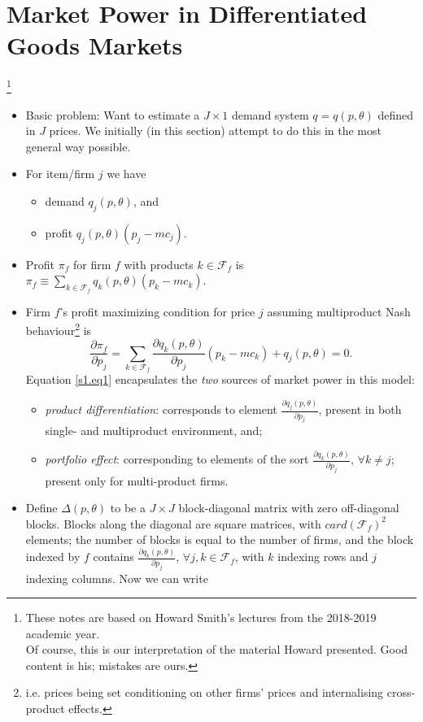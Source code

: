 \documentclass[11pt]{article}
\numberwithin{equation}{section}
\newcommand\blfootnote[1]{%
	\begingroup
	\renewcommand\thefootnote{}\footnote{#1}%
	\addtocounter{footnote}{-1}%
	\endgroup
}
\begin{document}
\section{Market Power in Differentiated Goods Markets}\label{s1}
\blfootnote{These notes are based on Howard Smith's lectures from the 2018-2019 academic year.\\
Of course, this is our interpretation of the material Howard presented. Good content is his; mistakes are ours.}

\vspace{-1cm}
\begin{itemize}
	\item Basic problem: Want to estimate a $J\times 1$ demand system $q=q(p,\theta)$ defined in $J$ prices. We initially (in this section) attempt to do this in the most general way possible.
	\item For item/firm $j$ we have
	\begin{itemize}
		\item demand $q_j(p,\theta)$, and
		\item profit $q_j(p,\theta)(p_j - mc_j)$.
	\end{itemize}
	\item Profit $\pi_f$ for firm $f$ with products $k\in \mathscr{F}_f$ is $\pi_f \equiv \sum_{k\in \mathscr{F}_f}q_k(p,\theta)(p_k - mc_k)$.
	\item Firm $f$'s profit maximizing condition for price $j$ assuming multiproduct Nash behaviour\footnote{i.e. prices being set conditioning on other firms' prices and internalising cross-product effects.} is
	\begin{equation}\label{s1.eq1}
	 \frac{\partial \pi_f}{\partial p_j} = \sum_{k\in \mathscr{F}_f} \frac{\partial q_k(p,\theta)}{\partial p_j}(p_k - mc_k) + q_j(p,\theta) = 0.
	\end{equation}
	Equation \ref{s1.eq1} encapsulates the \emph{two} sources of market power in this model:
	\begin{itemize}
		\item \emph{product differentiation}: corresponds to element $\frac{\partial q_j(p,\theta)}{\partial p_j}$, present in both single- and multiproduct environment, and;
		\item \emph{portfolio effect}: corresponding to elements of the sort $\frac{\partial q_k(p,\theta)}{\partial p_j}$, $\forall k\neq j$; present only for multi-product firms.
	\end{itemize}
	\item Define  $\Delta(p,\theta)$ to be a $J\times J$ block-diagonal matrix with zero off-diagonal blocks. Blocks along the diagonal are square matrices, with $card(\mathscr{F}_f)^2$ elements; the number of blocks is equal to the number of firms, and the block indexed by $f$ contains $\frac{\partial q_k(p,\theta)}{\partial p_j}$, $\forall j,k\in \mathscr{F}_f$, with $k$ indexing rows and $j$ indexing columns. Now we can write

\end{itemize}
\end{document}

